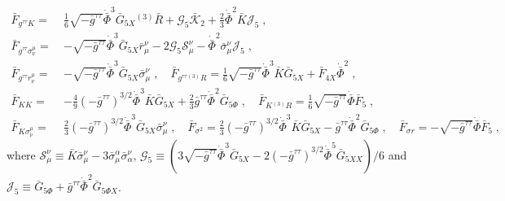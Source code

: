 \documentclass[a4paper,11pt]{article}
\numberwithin{equation}{section}
\begin{document}
\begin{align}
 \bar{F}_{g^{\tau\tau} K} = \ & \frac{1}{6}\sqrt{-\bar{g}^{\tau\tau}} \dot{\bar{\Phi}}^3 \bar{G}_{5X}  {}^{(3)}\!\bar{R} + \mathcal{G}_5 \mathcal{\bar{K}}_2 + \frac{2}{3}\dot{\bar{\Phi}}^2 \bar{K} \mathcal{J}_5 \;, \nonumber \\
 \bar{F}_{g^{\tau\tau}\sigma^\mu_\nu} = \ &-\sqrt{-\bar{g}^{\tau\tau}}\dot{\bar{\Phi}}^3 \bar{G}_{5X} \bar{r}^\nu_\mu - 2 \mathcal{G}_5 \mathcal{S}_\mu^\nu - \dot{\bar{\Phi}}^2 \bar{\sigma}^\nu_\mu \mathcal{J}_5 \;,  \nonumber \\
 \bar{F}_{g^{\tau\tau}r^\mu_\nu} = \ &-\sqrt{-\bar{g}^{\tau\tau}}\dot{\bar{\Phi}}^3 \bar{G}_{5X} \bar{\sigma}^\nu_\mu \;, \quad \bar{F}_{g^{\tau\tau} {}^{(3)}\!R} =  \frac{1}{6}\sqrt{-\bar{g}^{\tau\tau}}\dot{\bar{\Phi}}^3 \bar{K} \bar{G}_{5X} + \bar{F}_{4X}\dot{\bar{\Phi}}^2 \;, \nonumber \\ 
\bar{F}_{KK} = \ & -\frac{4}{9} (-\bar{g}^{\tau\tau})^{3/2} \dot{\bar{\Phi}}^3 \bar{K} \bar{G}_{5X} +  \frac{2}{3} \bar{g}^{\tau\tau} \dot{\bar{\Phi}}^2 \bar{G}_{5\Phi} \;, \quad
 \bar{F}_{K {}^{(3)}\!R} =  \frac{1}{6} \sqrt{-\bar{g}^{\tau\tau}} \dot{\bar{\Phi}} \bar{F}_5 \;, \nonumber \\
  \bar{F}_{K \sigma^\mu_\nu} = \ & \frac{2}{3}  (-\bar{g}^{\tau\tau})^{3/2} \dot{\bar{\Phi}}^3 \bar{G}_{5X}  \bar{\sigma}^\nu_\mu \;, \quad 
  \bar{F}_{\sigma^2} = \frac{2}{3} (-\bar{g}^{\tau\tau})^{3/2} \dot{\bar{\Phi}}^3 \bar{K} \bar{G}_{5X} - \bar{g}^{\tau\tau} \dot{\bar{\Phi}}^2 \bar{G}_{5\Phi} \;, \quad
    \bar{F}_{\sigma r} = -\sqrt{-\bar{g}^{\tau\tau}}\dot{\bar{\Phi}} \bar{F}_5 \;, \nonumber
 \end{align} 
where $\mathcal{S}_\mu^\nu \equiv \bar{K} \bar{\sigma}^\nu_\mu - 3 \bar{\sigma}^\alpha_\mu \bar{\sigma}^\nu_\alpha$, $\mathcal{G}_5 \equiv (3 \sqrt{-\bar{g}^{\tau\tau}} \dot{\bar{\Phi}}^3 \bar{G}_{5X} - 2(-\bar{g}^{\tau\tau})^{3/2}\dot{\bar{\Phi}}^5 \bar{G}_{5XX})/6$ and $\mathcal{J}_5 \equiv \bar{G}_{5\Phi} + \bar{g}^{\tau\tau} \dot{\bar{\Phi}}^2 \bar{G}_{5\Phi X}$.
\end{document}
